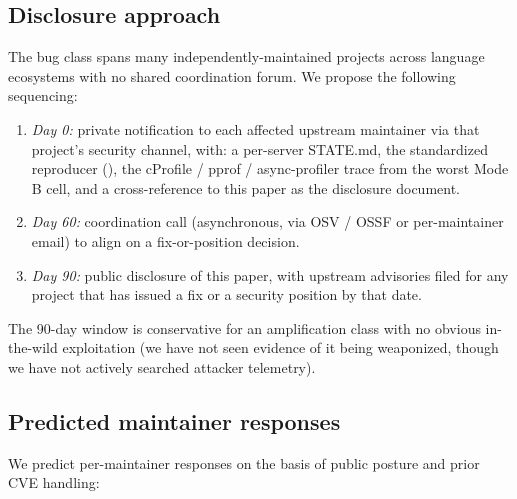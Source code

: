 \subsection{Disclosure approach}
\label{sec:disc-approach}

The bug class spans many independently-maintained projects across
language ecosystems with no shared coordination forum. We propose
the following sequencing:

\begin{enumerate}
  \item \emph{Day 0:} private notification to each affected upstream
    maintainer via that project's security channel, with:
    a per-server STATE.md, the standardized reproducer
    (), the cProfile /
    pprof / async-profiler trace from the worst Mode B cell, and a
    cross-reference to this paper as the disclosure document.
  \item \emph{Day 60:} coordination call (asynchronous, via OSV / OSSF
    or per-maintainer email) to align on a fix-or-position
    decision.
  \item \emph{Day 90:} public disclosure of this paper, with
    upstream advisories filed for any project that has issued a
    fix or a security position by that date.
\end{enumerate}

The 90-day window is conservative for an amplification class with
no obvious in-the-wild exploitation (we have not seen evidence of
it being weaponized, though we have not actively searched
attacker telemetry).

\subsection{Predicted maintainer responses}
\label{sec:disc-predict}

We predict per-maintainer responses on the basis of public posture
and prior CVE handling:

